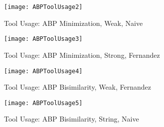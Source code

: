 \begin{figure}[!ht]
\centering
\texttt{[image: ABPToolUsage2]}
\caption{Tool Usage: ABP Minimization, Weak, Naive}
\label{fig:abptoolusage2}
\end{figure}

\begin{figure}[!ht]
\centering
\texttt{[image: ABPToolUsage3]}
\caption{Tool Usage: ABP Minimization, Strong, Fernandez}
\label{fig:abptoolusage3}
\end{figure}

\begin{figure}[!ht]
\centering
\texttt{[image: ABPToolUsage4]}
\caption{Tool Usage: ABP Bisimilarity, Weak, Fernandez}
\label{fig:abptoolusage4}
\end{figure}

\begin{figure}[!ht]
\centering
\texttt{[image: ABPToolUsage5]}
\caption{Tool Usage: ABP Bisimilarity, String, Naive}
\label{fig:abptoolusage5}
\end{figure}